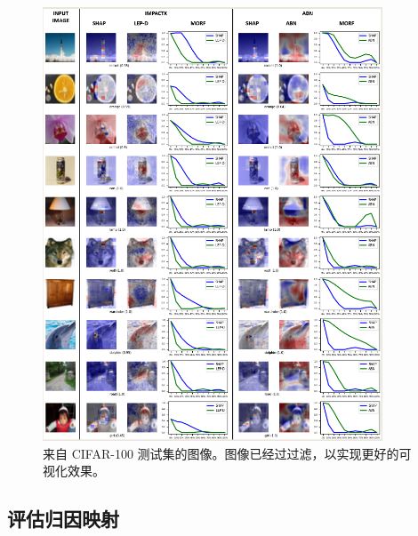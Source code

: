 \documentclass[12pt, a4paper]{ctexart} %
\begin{document}
\begin{figure}[H]
  \centering
  \includegraphics[width=0.9\textwidth]{img/IMPACTX_4.png}
  \caption{来自 CIFAR-100 测试集的图像。图像已经过过滤，以实现更好的可视化效果。}
\end{figure}


\subsection{评估归因映射}
\end{document}
